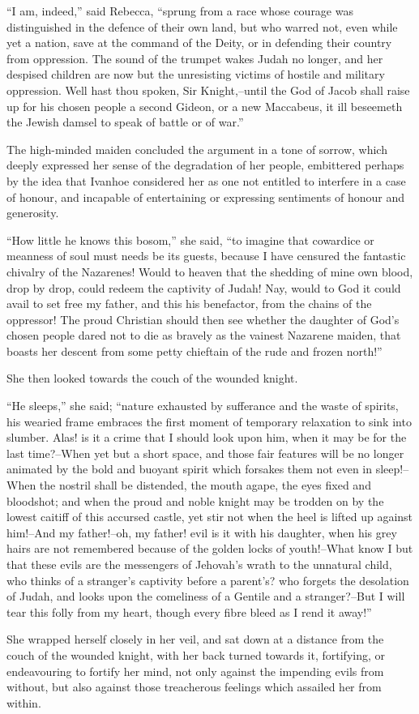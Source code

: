 ``I am, indeed,'' said Rebecca, ``sprung from a race whose courage was
distinguished in the defence of their own land, but who warred not, even
while yet a nation, save at the command of the Deity, or in defending
their country from oppression. The sound of the trumpet wakes Judah no
longer, and her despised children are now but the unresisting victims of
hostile and military oppression. Well hast thou spoken, Sir
Knight,--until the God of Jacob shall raise up for his chosen people a
second Gideon, or a new Maccabeus, it ill beseemeth the Jewish damsel to
speak of battle or of war.''

The high-minded maiden concluded the argument in a tone of sorrow, which
deeply expressed her sense of the degradation of her people, embittered
perhaps by the idea that Ivanhoe considered her as one not entitled to
interfere in a case of honour, and incapable of entertaining or
expressing sentiments of honour and generosity.

``How little he knows this bosom,'' she said, ``to imagine that
cowardice or meanness of soul must needs be its guests, because I have
censured the fantastic chivalry of the Nazarenes! Would to heaven that
the shedding of mine own blood, drop by drop, could redeem the captivity
of Judah! Nay, would to God it could avail to set free my father, and
this his benefactor, from the chains of the oppressor! The proud
Christian should then see whether the daughter of God's chosen people
dared not to die as bravely as the vainest Nazarene maiden, that boasts
her descent from some petty chieftain of the rude and frozen north!''

She then looked towards the couch of the wounded knight.

``He sleeps,'' she said; ``nature exhausted by sufferance and the waste
of spirits, his wearied frame embraces the first moment of temporary
relaxation to sink into slumber. Alas! is it a crime that I should look
upon him, when it may be for the last time?--When yet but a short space,
and those fair features will be no longer animated by the bold and
buoyant spirit which forsakes them not even in sleep!--When the nostril
shall be distended, the mouth agape, the eyes fixed and bloodshot; and
when the proud and noble knight may be trodden on by the lowest caitiff
of this accursed castle, yet stir not when the heel is lifted up against
him!--And my father!--oh, my father! evil is it with his daughter, when
his grey hairs are not remembered because of the golden locks of
youth!--What know I but that these evils are the messengers of Jehovah's
wrath to the unnatural child, who thinks of a stranger's captivity
before a parent's? who forgets the desolation of Judah, and looks upon
the comeliness of a Gentile and a stranger?--But I will tear this folly
from my heart, though every fibre bleed as I rend it away!''

She wrapped herself closely in her veil, and sat down at a distance from
the couch of the wounded knight, with her back turned towards it,
fortifying, or endeavouring to fortify her mind, not only against the
impending evils from without, but also against those treacherous
feelings which assailed her from within.

